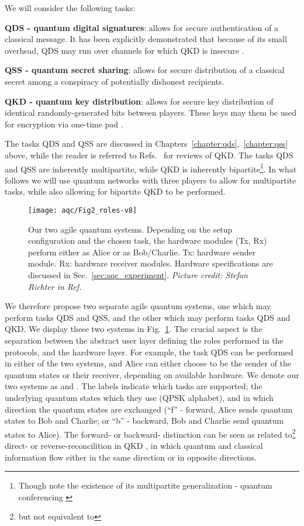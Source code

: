 We will consider the following tasks:

\textbf{QDS - quantum digital signatures}: allows for secure authentication of a classical message. It has been explicitly demonstrated that because of its small overhead, QDS may run over channels for which QKD is insecure \cite{Amiri2016}.

\textbf{QSS - quantum secret sharing}: allows for secure distribution of a classical secret among a conspiracy of potentially dishonest recipients.

\textbf{QKD - quantum key distribution}: allows for secure key distribution of identical randomly-generated bits between players. These keys may them be used for encryption via one-time pad \cite{Bennett1984, Schneier1996}.

The tasks QDS and QSS are discussed in Chapters~\ref{chapter:qds},~\ref{chapter:qss} above, while the reader is referred to Refs.~\cite{Laudenbach2017, Scarani2009} for reviews of QKD. The tasks QDS and QSS are inherently multipartite, while QKD is inherently bipartite\footnote{Though note the existence of its multipartite generalization - quantum conferencing \cite{Ottaviani2017b, Ottaviani2019}}. In what follows we will use quantum networks with three players to allow for multipartite tasks, while also allowing for bipartite QKD to be performed.

\begin{figure}[htp]
\captionsetup{width=0.8\linewidth}
\centering
\texttt{[image: aqc/Fig2\_roles-v8]}
\caption{\label{fig:agile_tasks} Our two agile quantum systems. Depending on the setup configuration and the chosen task, the hardware modules (Tx, Rx) perform either as Alice or as Bob/Charlie. Tx: hardware sender module. Rx: hardware receiver modules. Hardware specifications are discussed in Sec.~\ref{sec:aqc_experiment}. \emph{Picture credit: Stefan Richter in Ref.~\cite{Richter2020}}}
\end{figure}

We therefore propose two separate agile quantum systems, one which may perform tasks QDS and QSS, and the other which may perform tasks QDS and QKD. We display these two systems in Fig.~\ref{fig:agile_tasks}. The crucial aspect is the separation between the abstract user layer defining the roles performed in the protocols, and the hardware layer. For example, the task QDS can be performed in either of the two systems, and Alice can either choose to be the sender of the quantum states or their receiver, depending on available hardware. We denote our two systems as \systemB \;and \systemF. The labels indicate which tasks are supported; the underlying quantum states which they use (QPSK alphabet), and in which direction the quantum states are exchanged (``f'' - forward, Alice sends quantum states to Bob and Charlie; or ``b'' - backward, Bob and Charlie send quantum states to Alice). The forward- or backward- distinction can be seen as related to\footnote{but not equivalent to} direct- or reverse-reconcilition in QKD \cite{Laudenbach2017}, in which quantum and classical information flow either in the same direction or in opposite directions.




